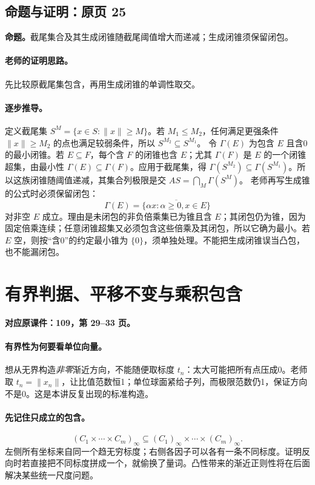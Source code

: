 \subsection{命题与证明：原页 25}

\textbf{命题。}截尾集合及其生成闭锥随截尾阈值增大而递减；生成闭锥须保留闭包。

\paragraph{老师的证明思路。}先比较原截尾集包含，再用生成闭锥的单调性取交。

\paragraph{逐步推导。}
定义截尾集 $S^M=\{x\in S:\|x\|\ge M\}$。若 $M_1\le M_2$，任何满足更强条件 $\|x\|\ge M_2$ 的点也满足较弱条件，所以 $S^{M_2}\subseteq S^{M_1}$。
令 $\Gamma(E)$ 为包含 $E$ 且含0的最小闭锥。若 $E\subseteq F$，每个含 $F$ 的闭锥也含 $E$；尤其 $\Gamma(F)$ 是 $E$ 的一个闭锥超集，由最小性 $\Gamma(E)\subseteq\Gamma(F)$。应用于截尾集，得 $\Gamma(S^{M_2})\subseteq\Gamma(S^{M_1})$。所以这族闭锥随阈值递减，其集合列极限是交 $A S=\bigcap_M\Gamma(S^M)$。
老师再写生成锥的公式时必须保留闭包：
\[\Gamma(E)=\overline{\{\alpha x:\alpha\ge0,x\in E\}}\]
对非空 $E$ 成立。理由是未闭包的非负倍乘集已为锥且含 $E$；其闭包仍为锥，因为固定倍乘连续；任意闭锥超集又必须包含这些倍乘及其闭包，所以它确为最小。若 $E$ 空，则按“含0”的约定最小锥为 $\{0\}$，须单独处理。不能把生成闭锥误当凸包，也不能漏闭包。


\clearpage\section{有界判据、平移不变与乘积包含}\label{g:109:29}

\textbf{对应原课件：109，第 29--33 页。}


\paragraph{有界性为何要看单位向量。}
想从无界构造\emph{非零}渐近方向，不能随便取标度 $t_n$：太大可能把所有点压成0。老师取 $t_n=\|x_n\|$，让比值范数恒1；单位球面紧给子列，而极限范数仍1，保证方向不是0。这是本讲反复出现的标准构造。
\paragraph{先记住只成立的包含。}
\[(C_1\times\cdots\times C_m)_\infty
\subseteq(C_1)_\infty\times\cdots\times(C_m)_\infty.
\]
左侧所有坐标来自同一个趋无穷标度；右侧各因子可以各有一条不同标度。证明反向时若直接把不同标度拼成一个，就偷换了量词。凸性带来的渐近正则性将在后面解决某些统一尺度问题。


